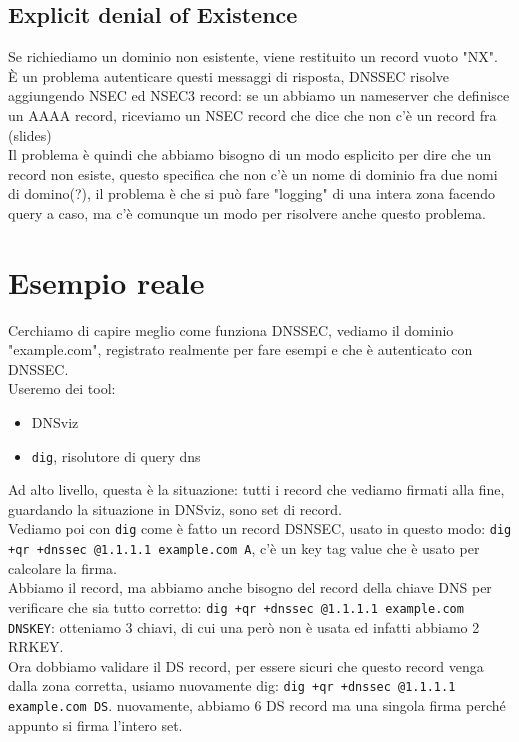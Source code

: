 \documentclass[12pt, oneside]{extbook} %
\begin{document}
\subsection{Explicit denial of Existence}
Se richiediamo un dominio non esistente, viene restituito un record vuoto "NX". È un problema autenticare questi messaggi di risposta, DNSSEC risolve aggiungendo NSEC ed NSEC3 record: se un abbiamo un nameserver che definisce un AAAA record, riceviamo un NSEC record che dice che non c'è un record fra (slides)\\Il problema è quindi che abbiamo bisogno di un modo esplicito per dire che un record non esiste, questo specifica che non c'è un nome di dominio fra due nomi di domino(?), il problema è che si può fare "logging" di una intera zona facendo query a caso, ma c'è comunque un modo per risolvere anche questo problema.
\section{Esempio reale}
Cerchiamo di capire meglio come funziona DNSSEC, vediamo il dominio "example.com", registrato realmente per fare esempi e che è autenticato con DNSSEC.\\Useremo dei tool:
\begin{itemize}
	\item DNSviz
	\item \texttt{dig}, risolutore di query dns
\end{itemize}
Ad alto livello, questa è la situazione:
tutti i record che vediamo firmati alla fine, guardando la situazione in DNSviz, sono set di record.\\Vediamo poi con \texttt{dig} come è fatto un record DSNSEC, usato in questo modo: \texttt{dig +qr +dnssec @1.1.1.1 example.com A}, c'è un key tag value che è usato per calcolare la firma.\\Abbiamo il record, ma abbiamo anche bisogno del record della chiave DNS per verificare che sia tutto corretto: \texttt{dig +qr +dnssec @1.1.1.1 example.com DNSKEY}: otteniamo 3 chiavi, di cui una però non è usata ed infatti abbiamo 2 RRKEY.\\Ora dobbiamo validare il DS record, per essere sicuri che questo record venga dalla zona corretta, usiamo nuovamente dig: \texttt{dig +qr +dnssec @1.1.1.1 example.com DS}. nuovamente, abbiamo 6 DS record ma una singola firma perché appunto si firma l'intero set.
\end{document}
